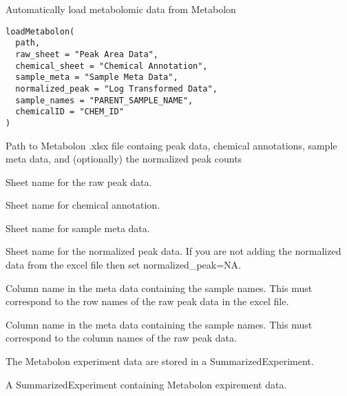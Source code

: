 \documentclass[a4paper]{book}
\begin{document}
%
\begin{Description}
Automatically load metabolomic data from Metabolon
\end{Description}
%
\begin{Usage}
\begin{verbatim}
loadMetabolon(
  path,
  raw_sheet = "Peak Area Data",
  chemical_sheet = "Chemical Annotation",
  sample_meta = "Sample Meta Data",
  normalized_peak = "Log Transformed Data",
  sample_names = "PARENT_SAMPLE_NAME",
  chemicalID = "CHEM_ID"
)
\end{verbatim}
\end{Usage}
%
\begin{Arguments}
\begin{ldescription}
\item[\code{path}] Path to Metabolon .xlsx file containg peak data, chemical annotations,
sample meta data, and (optionally) the normalized peak counts

\item[\code{raw\_sheet}] Sheet name for the raw peak data.

\item[\code{chemical\_sheet}] Sheet name for chemical annotation.

\item[\code{sample\_meta}] Sheet name for sample meta data.

\item[\code{normalized\_peak}] Sheet name for the normalized peak data. If you are not
adding the normalized data from the excel file then set normalized\_peak=NA.

\item[\code{sample\_names}] Column name in the meta data containing the sample names. This must correspond to
the row names of the raw peak data in the excel file.

\item[\code{chemicalID}] Column name in the meta data containing the sample names. This must correspond to
the column names of the raw peak data.
\end{ldescription}
\end{Arguments}
%
\begin{Details}
The Metabolon experiment data are stored in a SummarizedExperiment.
\end{Details}
%
\begin{Value}
A SummarizedExperiment containing Metabolon expirement data.
\end{Value}
%
\begin{SeeAlso}
\end{SeeAlso}
\end{document}
